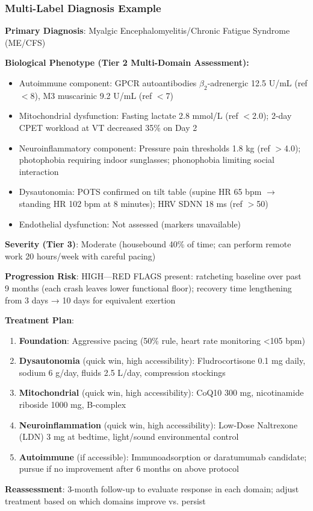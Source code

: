 \subsubsection{Multi-Label Diagnosis Example}

\begin{observation}
\textbf{Primary Diagnosis}: Myalgic Encephalomyelitis/Chronic Fatigue Syndrome (ME/CFS)

\textbf{Biological Phenotype (Tier 2 Multi-Domain Assessment):}
\begin{itemize}
    \item[$\checkmark$] Autoimmune component: GPCR autoantibodies $\beta_2$-adrenergic 12.5 U/mL (ref $<$8), M3 muscarinic 9.2 U/mL (ref $<$7)
    \item[$\checkmark$] Mitochondrial dysfunction: Fasting lactate 2.8 mmol/L (ref $<$2.0); 2-day CPET workload at VT decreased 35\% on Day 2
    \item[$\checkmark$] Neuroinflammatory component: Pressure pain thresholds 1.8 kg (ref $>$4.0); photophobia requiring indoor sunglasses; phonophobia limiting social interaction
    \item[$\checkmark$] Dysautonomia: POTS confirmed on tilt table (supine HR 65 bpm $\rightarrow$ standing HR 102 bpm at 8 minutes); HRV SDNN 18 ms (ref $>$50)
    \item[$\times$] Endothelial dysfunction: Not assessed (markers unavailable)
\end{itemize}

\textbf{Severity (Tier 3)}: Moderate (housebound 40\% of time; can perform remote work 20 hours/week with careful pacing)

\textbf{Progression Risk}: HIGH—RED FLAGS present: ratcheting baseline over past 9 months (each crash leaves lower functional floor); recovery time lengthening from 3 days → 10 days for equivalent exertion

\textbf{Treatment Plan}:
\begin{enumerate}
    \item \textbf{Foundation}: Aggressive pacing (50\% rule, heart rate monitoring <105 bpm)
    \item \textbf{Dysautonomia} (quick win, high accessibility): Fludrocortisone 0.1 mg daily, sodium 6 g/day, fluids 2.5 L/day, compression stockings
    \item \textbf{Mitochondrial} (quick win, high accessibility): CoQ10 300 mg, nicotinamide riboside 1000 mg, B-complex
    \item \textbf{Neuroinflammation} (quick win, high accessibility): Low-Dose Naltrexone (LDN) 3 mg at bedtime, light/sound environmental control
    \item \textbf{Autoimmune} (if accessible): Immunoadsorption or daratumumab candidate; pursue if no improvement after 6 months on above protocol
\end{enumerate}

\textbf{Reassessment}: 3-month follow-up to evaluate response in each domain; adjust treatment based on which domains improve vs. persist
\end{observation}


